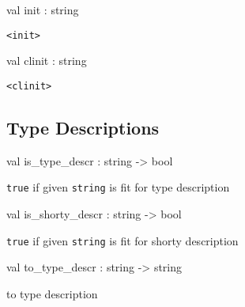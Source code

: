 \documentclass[11pt]{article}
\begin{document}
\label{val:Java.init}\begin{ocamldoccode}
val init : string
\end{ocamldoccode}
\begin{ocamldocdescription}
{\tt{<init>}}


\end{ocamldocdescription}




\label{val:Java.clinit}\begin{ocamldoccode}
val clinit : string
\end{ocamldoccode}
\begin{ocamldocdescription}
{\tt{<clinit>}}


\end{ocamldocdescription}




\subsection{Type Descriptions}




\label{val:Java.is-underscoretype-underscoredescr}\begin{ocamldoccode}
val is_type_descr : string -> bool
\end{ocamldoccode}
\begin{ocamldocdescription}
{\tt{true}} if given {\tt{string}} is fit for type description


\end{ocamldocdescription}




\label{val:Java.is-underscoreshorty-underscoredescr}\begin{ocamldoccode}
val is_shorty_descr : string -> bool
\end{ocamldoccode}
\begin{ocamldocdescription}
{\tt{true}} if given {\tt{string}} is fit for shorty description


\end{ocamldocdescription}




\label{val:Java.to-underscoretype-underscoredescr}\begin{ocamldoccode}
val to_type_descr : string -> string
\end{ocamldoccode}
\begin{ocamldocdescription}
to type description


\end{ocamldocdescription}
\end{document}
